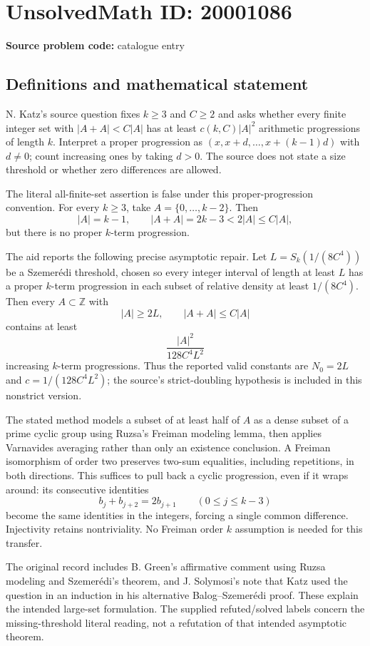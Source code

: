 \documentclass[11pt]{article}
\newcommand{\Z}{\mathbb{Z}}
\begin{document}
\section*{UnsolvedMath ID: 20001086}
\textbf{Source problem code:} catalogue entry
\subsection{Definitions and mathematical statement}
N. Katz's source question fixes $k\geq3$ and $C\geq2$ and asks whether every finite integer set with $|A+A|<C|A|$ has at least $c(k,C)|A|^2$ arithmetic progressions of length $k$. Interpret a proper progression as $(x,x+d,\ldots,x+(k-1)d)$ with $d\neq0$; count increasing ones by taking $d>0$. The source does not state a size threshold or whether zero differences are allowed.

The literal all-finite-set assertion is false under this proper-progression convention. For every $k\geq3$, take $A=\{0,\ldots,k-2\}$. Then
\[
 |A|=k-1,\qquad |A+A|=2k-3<2|A|\leq C|A|,
\]
but there is no proper $k$-term progression.

The aid reports the following precise asymptotic repair. Let $L=S_k(1/(8C^4))$ be a Szemer\'edi threshold, chosen so every integer interval of length at least $L$ has a proper $k$-term progression in each subset of relative density at least $1/(8C^4)$. Then every $A\subset\Z$ with
\[
 |A|\geq2L,\qquad |A+A|\leq C|A|
\]
contains at least
\[
 \frac{|A|^2}{128C^4L^2}
\]
increasing $k$-term progressions. Thus the reported valid constants are $N_0=2L$ and $c=1/(128C^4L^2)$; the source's strict-doubling hypothesis is included in this nonstrict version.

The stated method models a subset of at least half of $A$ as a dense subset of a prime cyclic group using Ruzsa's Freiman modeling lemma, then applies Varnavides averaging rather than only an existence conclusion. A Freiman isomorphism of order two preserves two-sum equalities, including repetitions, in both directions. This suffices to pull back a cyclic progression, even if it wraps around: its consecutive identities
\[
 b_j+b_{j+2}=2b_{j+1}\qquad(0\leq j\leq k-3)
\]
become the same identities in the integers, forcing a single common difference. Injectivity retains nontriviality. No Freiman order $k$ assumption is needed for this transfer.

The original record includes B. Green's affirmative comment using Ruzsa modeling and Szemer\'edi's theorem, and J. Solymosi's note that Katz used the question in an induction in his alternative Balog--Szemer\'edi proof. These explain the intended large-set formulation. The supplied refuted/solved labels concern the missing-threshold literal reading, not a refutation of that intended asymptotic theorem.
\end{document}
